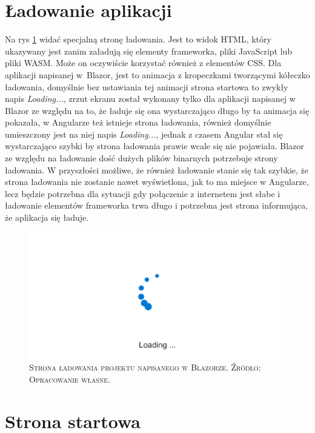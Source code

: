\documentclass[12pt,a4paper,oneside]{book}
\newcommand{\captionT}[1]{\caption{\textsc{\footnotesize{#1}}}}
\begin{document}
\section{Ładowanie aplikacji}

Na rys \ref{rys_app_blazor_loading} widać specjalną stronę ładowania. Jest to widok HTML, który ukazywany jest zanim załadują się elementy frameworka, pliki JavaScript lub pliki WASM. Może on oczywiście korzystać również z elementów CSS. Dla aplikacji napisanej w~Blazor, jest to animacja z kropeczkami tworzącymi kółeczko ładowania, domyślnie bez ustawiania tej animacji strona startowa to zwykły napis \textit{Loading...}, zrzut ekranu został wykonany tylko dla aplikacji napisanej w Blazor ze względu na to, że ładuje się ona wystarczająco długo by ta animacja się pokazała, w Angularze też istnieje strona ładowania, również domyślnie umieszczony jest na niej napis \textit{Loading...}, jednak z czasem Angular stał się wystarczająco szybki by strona ładowania prawie wcale się nie pojawiała. Blazor ze względu na ładowanie dość dużych plików binarnych potrzebuje strony ładowania. W przyszłości możliwe, że również ładowanie stanie się tak szybkie, że strona ładowania nie zostanie nawet wyświetlona, jak to ma miejsce w Angularze, lecz będzie potrzebna dla sytuacji gdy połączenie z internetem jest słabe i ładowanie elementów frameworka trwa długo i potrzebna jest strona informująca, że aplikacja się ładuje.

\begin{figure}[H]
\centering
\includegraphics[width=1\textwidth]{images/BlazorApp/BlazorStronaLadowania.pdf}
\captionT{Strona ładowania projektu napisanego w Blazorze. Źródło: Opracowanie własne.}
\label{rys_app_blazor_loading}
\end{figure}

\section{Strona startowa} 
\end{document}
